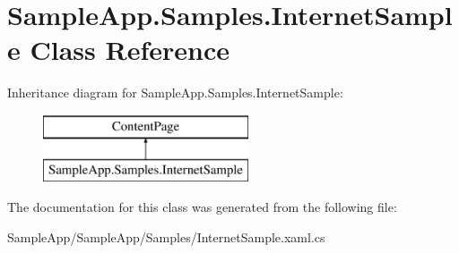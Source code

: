 \hypertarget{class_sample_app_1_1_samples_1_1_internet_sample}{}\section{Sample\+App.\+Samples.\+Internet\+Sample Class Reference}
\label{class_sample_app_1_1_samples_1_1_internet_sample}
Inheritance diagram for Sample\+App.\+Samples.\+Internet\+Sample\+:\begin{figure}[H]
\begin{center}
\leavevmode
\includegraphics[height=2.000000cm]{class_sample_app_1_1_samples_1_1_internet_sample}
\end{center}
\end{figure}


The documentation for this class was generated from the following file\+:\begin{DoxyCompactItemize}
\item 
Sample\+App/\+Sample\+App/\+Samples/Internet\+Sample.\+xaml.\+cs\end{DoxyCompactItemize}
